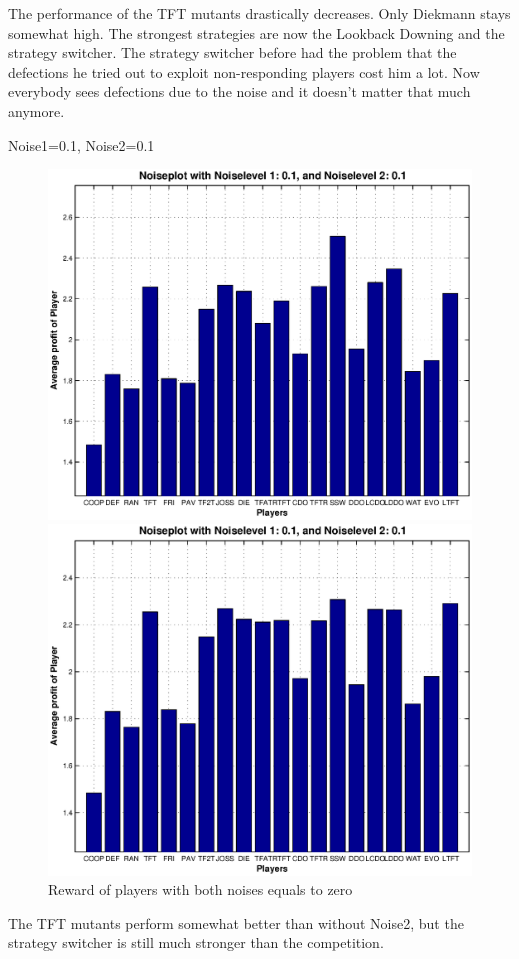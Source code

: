 The performance of the TFT mutants drastically decreases. Only Diekmann stays somewhat high. The strongest strategies are now the Lookback Downing and the strategy switcher. The strategy switcher before had the problem that the defections he tried out to exploit non-responding players cost him a lot. Now everybody sees defections due to the noise and it doesn’t matter that much anymore.

Noise1=0.1, Noise2=0.1

\begin{figure}[h]

\begin{minipage}[hbt]{0.68\textwidth}
	\centering
	\includegraphics[width=\textwidth]{pics/simulation1/Reward_of_all_Players_at_given_Noiselevels_4}
\end{minipage}
\hfill
\begin{minipage}[hbt]{0.3\textwidth}
	\centering
	\includegraphics[width=\textwidth]{pics/simulation2/Reward_of_all_Players_at_given_Noiselevels_4}
\end{minipage}	\caption{Reward of players with both noises equals to zero}
	\label{pic player noise1}
\end{figure}

The TFT mutants perform somewhat better than without Noise2, but the strategy switcher is still much stronger than the competition.





